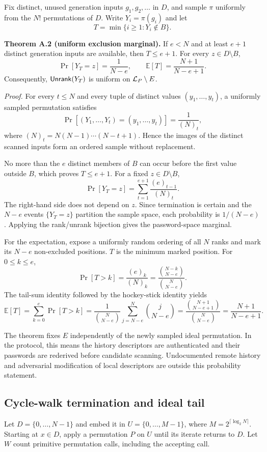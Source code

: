 Fix distinct, unused generation inputs $g_1,g_2,\ldots$ in $D$, and sample
$\pi$ uniformly from the $N!$ permutations of $D$.  Write $Y_i=\pi(g_i)$ and
let
\[
T=\min\{i\geq 1:Y_i\notin B\}.
\]

\textbf{Theorem A.2 (uniform exclusion marginal).}
If $e<N$ and at least $e+1$ distinct generation inputs are available, then
$T\leq e+1$.  For every $z\in D\setminus B$,
\[
\Pr[Y_T=z]=\frac{1}{N-e},
\qquad
\mathbb{E}[T]=\frac{N+1}{N-e+1}.
\]
Consequently, $\mathsf{Unrank}(Y_T)$ is uniform on $\mathcal{L}_P\setminus E$.

\textit{Proof.}
For every $t\leq N$ and every tuple of distinct values
$(y_1,\ldots,y_t)$, a uniformly sampled permutation satisfies
\[
\Pr[(Y_1,\ldots,Y_t)=(y_1,\ldots,y_t)]=\frac{1}{(N)_t},
\]
where $(N)_t=N(N-1)\cdots(N-t+1)$.  Hence the images of the distinct scanned
inputs form an ordered sample without replacement.

No more than the $e$ distinct members of $B$ can occur before the first value
outside $B$, which proves $T\leq e+1$.  For a fixed $z\in D\setminus B$,
\[
\Pr[Y_T=z]
=\sum_{t=1}^{e+1}\frac{(e)_{t-1}}{(N)_t}.
\]
The right-hand side does not depend on $z$.  Since termination is certain and
the $N-e$ events $\{Y_T=z\}$ partition the sample space, each probability is
$1/(N-e)$.  Applying the rank/unrank bijection gives the password-space
marginal.

For the expectation, expose a uniformly random ordering of all $N$ ranks and
mark its $N-e$ non-excluded positions.  $T$ is the minimum marked position.
For $0\leq k\leq e$,
\[
\Pr[T>k]=\frac{(e)_k}{(N)_k}
=\frac{\binom{N-k}{N-e}}{\binom{N}{N-e}}.
\]
The tail-sum identity followed by the hockey-stick identity yields
\[
\mathbb{E}[T]
=\sum_{k=0}^{e}\Pr[T>k]
=\frac{1}{\binom{N}{N-e}}
  \sum_{j=N-e}^{N}\binom{j}{N-e}
=\frac{\binom{N+1}{N-e+1}}{\binom{N}{N-e}}
=\frac{N+1}{N-e+1}.
\tag*{$\square$}
\]

The theorem fixes $E$ independently of the newly sampled ideal permutation.
In the protocol, this means the history descriptors are authenticated and
their passwords are rederived before candidate scanning.  Undocumented remote
history and adversarial modification of local descriptors are outside this
probability statement.

\subsection{Cycle-walk termination and ideal tail}

Let $D=\{0,\ldots,N-1\}$ and embed it in
$U=\{0,\ldots,M-1\}$, where $M=2^{\lceil\log_2N\rceil}$.  Starting at
$x\in D$, apply a permutation $P$ on $U$ until its iterate returns to $D$.
Let $W$ count primitive permutation calls, including the accepting call.

